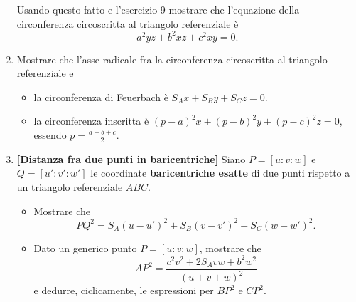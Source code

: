 \begin{enumerate}
	Usando questo fatto e l'esercizio 9 mostrare che l'equazione della circonferenza circoscritta al triangolo referenziale è
	\begin{equation}
	a^2yz+b^2xz+c^2xy=0.
	\end{equation}
	\item Mostrare che l'asse radicale fra la circonferenza circoscritta al triangolo referenziale e 
		\begin{itemize}
			\item la circonferenza di Feuerbach è $S_Ax+S_By+S_Cz=0$.
			\item la circonferenza inscritta è $(p-a)^2x+(p-b)^2y+(p-c)^2z=0$, essendo $p=\displaystyle\frac{a+b+c}{2}$.
		\end{itemize} 
	\item \textbf{[Distanza fra due punti in baricentriche]} Siano $P=[u:v:w]$ e $Q=[u':v':w']$ le coordinate \textbf{baricentriche esatte} di due punti rispetto a un triangolo referenziale $ABC$.
	\begin{itemize} 
	\item Mostrare che
	\begin{equation}
	PQ^2=S_A(u-u')^2+S_B(v-v')^2+S_C(w-w')^2.
	\end{equation}
	\item Dato un generico punto $P=[u:v:w]$, mostrare che 
	\begin{equation}
	AP^2=\frac{c^2v^2+2S_Avw+b^2w^2}{(u+v+w)^2}
	\end{equation}
	e dedurre, ciclicamente, le espressioni per $BP^2$ e $CP^2$.
	\end{itemize}
\end{enumerate}
\clearpage
